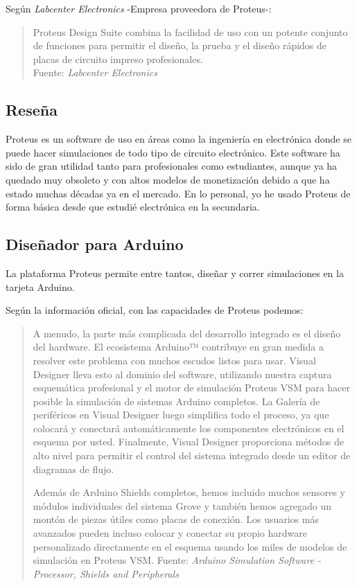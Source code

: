 \documentclass{article}
\begin{document}
Según \textit{Labcenter Electronics}\cite{labcenter-electronics-2022} -Empresa proveedora de Proteus-:

\begin{quote}
    Proteus Design Suite combina la facilidad de uso con un potente conjunto de funciones para permitir el diseño, la prueba y el diseño rápidos de placas de circuito impreso profesionales.\\ \footnotesize
    Fuente: \textit{Labcenter Electronics}\cite{labcenter-electronics-2022}
\end{quote}

\subsection{Reseña}

Proteus es un software de uso en áreas como la ingeniería en electrónica donde se puede hacer simulaciones de todo tipo de circuito electrónico. Este software ha sido de gran utilidad tanto para profesionales como estudiantes, aunque ya ha quedado muy obsoleto y con altos modelos de monetización debido a que ha estado muchas décadas ya en el mercado. En lo personal, yo he usado Proteus de forma básica desde que estudié electrónica en la secundaria.

\subsection{Diseñador para Arduino}

La plataforma Proteus permite entre tantos, diseñar y correr simulaciones en la tarjeta Arduino.

\bigbreak

Según la información oficial, con las capacidades de Proteus podemos:

\begin{quote}
    A menudo, la parte más complicada del desarrollo integrado es el diseño del hardware. El ecosistema Arduino™ contribuye en gran medida a resolver este problema con muchos escudos listos para usar. Visual Designer lleva esto al dominio del software, utilizando nuestra captura esquemática profesional y el motor de simulación Proteus VSM para hacer posible la simulación de sistemas Arduino completos. La Galería de periféricos en Visual Designer luego simplifica todo el proceso, ya que colocará y conectará automáticamente los componentes electrónicos en el esquema por usted. Finalmente, Visual Designer proporciona métodos de alto nivel para permitir el control del sistema integrado desde un editor de diagramas de flujo.
    
    \bigbreak
    
    Además de Arduino Shields completos, hemos incluido muchos sensores y módulos individuales del sistema Grove y también hemos agregado un montón de piezas útiles como placas de conexión. Los usuarios más avanzados pueden incluso colocar y conectar su propio hardware personalizado directamente en el esquema usando los miles de modelos de simulación en Proteus VSM.\bigbreak \footnotesize
    Fuente: \textit{Arduino Simulation Software - Processor, Shields and Peripherals} \cite{labcenter-electronics-2022}
\end{quote}
\end{document}
